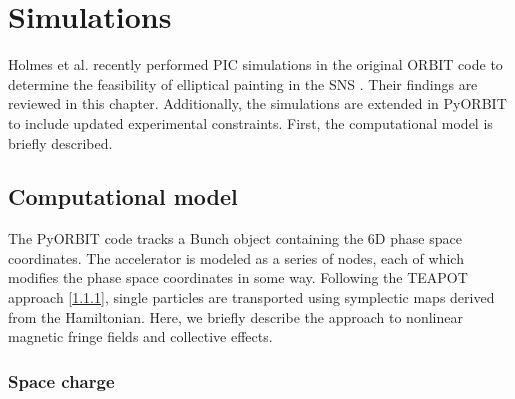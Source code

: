 \chapter{Simulations} \label{chap-3}

Holmes et al. recently performed PIC simulations in the original ORBIT code to determine the feasibility of elliptical painting in the SNS \cite{Holmes2018}. Their findings are reviewed in this chapter. Additionally, the simulations are extended in PyORBIT to include updated experimental constraints. First, the computational model is briefly described. 


\section{Computational model}

The PyORBIT code tracks a Bunch object containing the 6D phase space coordinates. The accelerator is modeled as a series of nodes, each of which modifies the phase space coordinates in some way. Following the TEAPOT approach [\ref{}], single particles are transported using symplectic maps derived from the Hamiltonian. Here, we briefly describe the approach to nonlinear magnetic fringe fields and collective effects. 

\subsection{Space charge}

